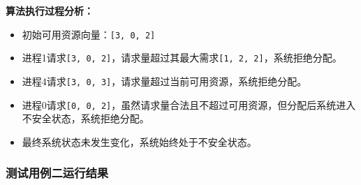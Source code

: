 \documentclass[12pt, a4paper, oneside]{ctexart}
\begin{document}
\textbf{算法执行过程分析：}
\begin{itemize}
    \item 初始可用资源向量：\texttt{[3, 0, 2]}
    \item 进程1请求\texttt{[3, 0, 2]}，请求量超过其最大需求\texttt{[1, 2, 2]}，系统拒绝分配。
    \item 进程4请求\texttt{[3, 0, 3]}，请求量超过当前可用资源，系统拒绝分配。
    \item 进程0请求\texttt{[0, 0, 2]}，虽然请求量合法且不超过可用资源，但分配后系统进入不安全状态，系统拒绝分配。
    \item 最终系统状态未发生变化，系统始终处于不安全状态。
\end{itemize}

\subsubsection{测试用例二运行结果}
\end{document}
